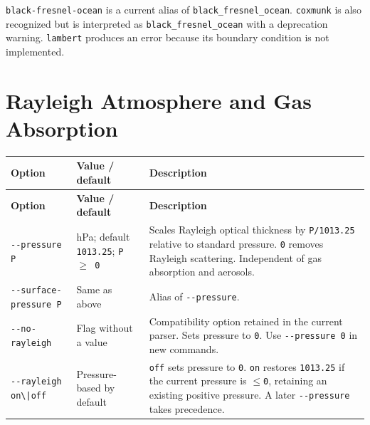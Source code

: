 \texttt{black-\allowbreak{}fresnel-\allowbreak{}ocean} is a current alias of \texttt{black\_\allowbreak{}fresnel\_\allowbreak{}ocean}. \texttt{coxmunk} is also recognized but is interpreted as \texttt{black\_\allowbreak{}fresnel\_\allowbreak{}ocean} with a deprecation warning. \texttt{lambert} produces an error because its boundary condition is not implemented.



\section{Rayleigh Atmosphere and Gas Absorption}
\label{sec:auto:03_options:3}



{\TableFont
\begin{longtable}{@{}>{\raggedright\arraybackslash}p{}>{\raggedright\arraybackslash}p{}>{\raggedright\arraybackslash}p{}@{}}
\toprule
\textbf{Option} & \textbf{Value / default} & \textbf{Description} \\
\midrule
\endfirsthead
\toprule
\textbf{Option} & \textbf{Value / default} & \textbf{Description} \\
\midrule
\endhead
\bottomrule
\endfoot
\texttt{-\allowbreak{}-\allowbreak{}pressure P} & hPa; default \texttt{1013.\allowbreak{}25}; \texttt{P \ensuremath{\geq} 0} & Scales Rayleigh optical thickness by \texttt{P/\allowbreak{}1013.\allowbreak{}25} relative to standard pressure. \texttt{0} removes Rayleigh scattering. Independent of gas absorption and aerosols. \\
\texttt{-\allowbreak{}-\allowbreak{}surface-\allowbreak{}pressure P} & Same as above & Alias of \texttt{-\allowbreak{}-\allowbreak{}pressure}. \\
\texttt{-\allowbreak{}-\allowbreak{}no-\allowbreak{}rayleigh} & Flag without a value & Compatibility option retained in the current parser. Sets pressure to \texttt{0}. Use \texttt{-\allowbreak{}-\allowbreak{}pressure 0} in new commands. \\
\texttt{-\allowbreak{}-\allowbreak{}rayleigh on\textbackslash{}|off\allowbreak{}} & Pressure-based by default & \texttt{off} sets pressure to \texttt{0}. \texttt{on} restores \texttt{1013.\allowbreak{}25} if the current pressure is \texttt{\ensuremath{\leq}0}, retaining an existing positive pressure. A later \texttt{-\allowbreak{}-\allowbreak{}pressure} takes precedence. \\

\end{longtable}}
